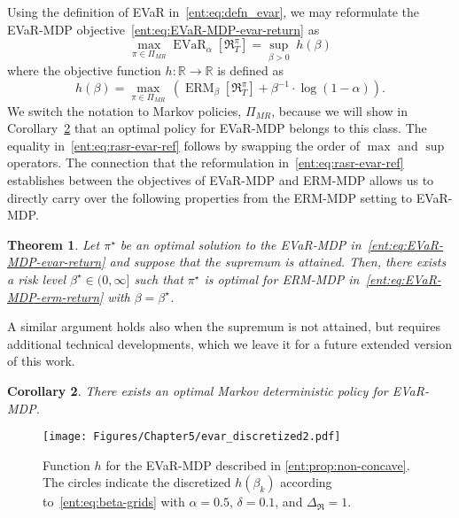 \documentclass[twoside]{article}
\newcommand{\opt}{^\star}
\newcommand{\vspan}{\Delta_{\mathfrak{R}}}
\newcommand{\erm}[2]{\operatorname{ERM}_{#1}\left[#2\right]}
\newcommand{\evar}[2]{\operatorname{EVaR}_{#1} \left[#2\right]}
\newcommand{\Real}{\mathbb{R}}
\theoremstyle{plain}
\newtheorem{theorem}{Theorem}[section]
\newtheorem{corollary}[theorem]{Corollary}
\theoremstyle{definition}
\theoremstyle{remark}
\begin{document}
Using the definition of EVaR in~\eqref{ent:eq:defn_evar}, we may reformulate the EVaR-MDP objective~\eqref{ent:eq:EVaR-MDP-evar-return} as
%
\begin{equation}
\label{ent:eq:rasr-evar-ref}
\max_{\pi\in\Pi_{MR}}  \evar{\alpha}{ \mathfrak{R}_{T}^\pi }  = \sup_{\beta > 0} \; h(\beta) 
\end{equation}
%
where the objective function $h\colon  \Real \to \Real$ is defined as
%
\begin{equation*}
  h(\beta) = \max_{\pi\in\Pi_{MR}}\, \left(\erm{\beta}{\mathfrak{R}_{T}^\pi} + \beta^{-1} \cdot \log(1-\alpha) \right).
\end{equation*}
%
We switch the notation to Markov policies, $\Pi_{MR}$, because we will show in Corollary~\ref{ent:cor:evar-markov} that an optimal policy for EVaR-MDP belongs to this class. The equality in~\eqref{ent:eq:rasr-evar-ref} follows by swapping the order of $\max$ and $\sup$ operators. The connection that the reformulation in~\eqref{ent:eq:rasr-evar-ref} establishes between the objectives of EVaR-MDP and ERM-MDP allows us to directly carry over the following properties from the ERM-MDP setting to EVaR-MDP. 
\begin{theorem} 
\label{ent:thm:equivalence-evar-erm}
Let $\pi\opt$ be an optimal solution to the EVaR-MDP in~\eqref{ent:eq:EVaR-MDP-evar-return} and suppose that the supremum is attained. Then, there exists a risk level $\beta\opt \in (0, \infty]$ such that $\pi\opt$ is optimal for ERM-MDP in~\eqref{ent:eq:EVaR-MDP-erm-return} with $\beta = \beta\opt$.
\end{theorem}
A similar argument holds also when the supremum is not attained, but requires additional technical developments, which we leave it for a future extended version of this work. 

\begin{corollary} \label{ent:cor:evar-markov}
There exists an optimal Markov deterministic policy for EVaR-MDP.%
\end{corollary}

\begin{figure}
\centering
\texttt{[image: Figures/Chapter5/evar\_discretized2.pdf]}
\vspace{-0.1in}
\caption{Function $h$ for the EVaR-MDP described in \cref{ent:prop:non-concave}. The circles indicate the discretized $h(\beta_k)$ according to~\eqref{ent:eq:beta-grids} with $\alpha = 0.5$, $\delta = 0.1$, and $\vspan = 1$.}
\label{ent:fig:h-example}
\end{figure}
\end{document}
